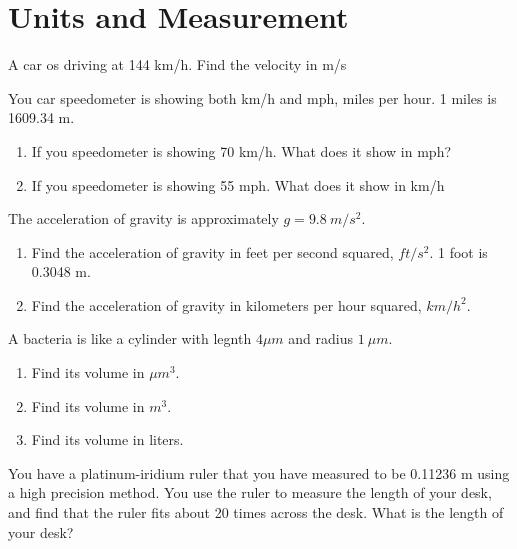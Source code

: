 \chapter{Units and Measurement}

\begin{problem}\label{problem_3_1}
    A car os driving at 144 km/h. Find the velocity in m/s
\end{problem}


\begin{problem}\label{problem_3_2}
    You car speedometer is showing both km/h and mph, miles per hour. 1 miles is 1609.34 m.
    \begin{enumerate}
        \item If you speedometer is showing 70 km/h. What does it show in mph?
        \item If you speedometer is showing 55 mph. What does it show in km/h
    \end{enumerate}
\end{problem}


\begin{problem}\label{problem_3_3}
    The acceleration of gravity is approximately $g=9.8 \ m/s^2$.
    \begin{enumerate}
        \item Find the acceleration of gravity in feet per second squared, $ft/s^{2}$. 1 foot is 0.3048 m.
        \item Find the acceleration of gravity in kilometers per hour  squared, $km/h^{2}$.
    \end{enumerate}
\end{problem}


\begin{problem}\label{problem_3_4}
    A bacteria is like a cylinder with legnth $4 \mu m$ and radius $1 \ \mu m$.
    \begin{enumerate}
        \item Find its volume in $\mu m^{3}$.
        \item Find its volume in $m^{3}$.
        \item Find its volume in liters.
    \end{enumerate}
\end{problem}


\begin{problem}\label{problem_3_5}
    You have a platinum-iridium ruler that you have measured to be 0.11236 m using a high precision method. You use the ruler to measure the length of your desk, and find that the ruler fits about 20 times across the desk. What is  the length of your desk?
\end{problem}



